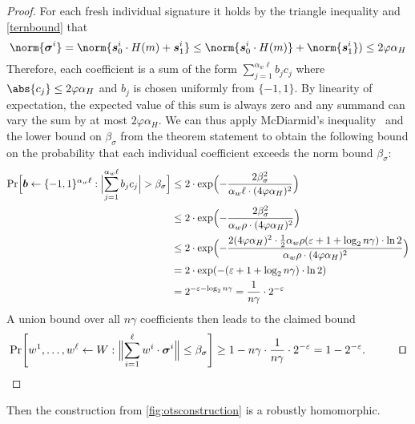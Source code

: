 \begin{proof}
  For each fresh individual signature it holds by the triangle inequality and \autoref{ternbound} that
  \[
    \norm{\vec{\sigma}^i} = \norm{\vec{s}_0^i\cdot H(m)+\vec{s}_1^i} \leq \norm{\vec{s}_0^i\cdot H(m)}+\norm{\vec{s}_1^i})
    \leq 2\varphi\alpha_H
  \]
  Therefore, each coefficient is a sum of the form
  \(
    \sum_{j=1}^{\alpha_w\ell}b_j c_j
  \)
  where $\abs{c_j}\leq 2\varphi\alpha_H$ and $b_j$ is chosen uniformly from $\{-1,1\}$.
  By linearity of expectation, the expected value of this sum is always zero and any summand can vary the sum by at most $2\varphi\alpha_H$. We can thus apply McDiarmid's inequality~\cite{McDiarmid89} and the lower bound on $\beta_\sigma$ from the theorem statement to obtain the following bound on the probability that each individual coefficient exceeds the norm bound $\beta_\sigma$:
  \begin{align*}
    \Pr\Bigl[\vec{b}\gets\{-1,1\}^{\alpha_w\ell} : \Bigl|\smashoperator{\sum_{j=1}^{\alpha_w\ell}}b_j c_j\Bigr| > \beta_\sigma\Bigr]
    \leq{}& 2\cdot\exp\Bigl(-\frac{2\beta_\sigma^2}{\alpha_w\ell\cdot (4\varphi\alpha_H)^2}\Bigr)\\
    \leq{}& 2\cdot\exp\Bigl(-\frac{2\beta_\sigma^2}{\alpha_w\rho\cdot (4\varphi\alpha_H)^2}\Bigr)\\
    \leq{}& 2\cdot\exp\Bigl(-\frac{2(4\varphi\alpha_H)^2\cdot\tfrac{1}{2}\alpha_w\rho(\varepsilon+1+\log_2n\gamma)\cdot\ln2}{\alpha_w\rho\cdot (4\varphi\alpha_H)^2}\Bigr)\\
    ={}& 2\cdot\exp(-(\varepsilon+1+\log_2n\gamma)\cdot\ln2)\\
    ={}& 2^{-\varepsilon-\log_2n\gamma} = \frac{1}{n\gamma}\cdot 2^{-\varepsilon}
  \end{align*}
  A union bound over all $n\gamma$ coefficients then leads to the claimed bound
  \[
    \Pr\mleft[
      w^1,\dots,w^\ell\gets W
      :
      \Bigl\Vert\sum_{i=1}^{\ell} w^i\cdot\vec{\sigma}^i\Bigr\Vert \leq \beta_\sigma\mright] \geq 1- n\gamma\cdot\frac{1}{n\gamma}\cdot 2^{-\varepsilon} = 1-2^{-\varepsilon}.\tag*{\qed}
  \]
\end{proof}

\begin{lemma}\label{lem:kots_homomorphic}
  Then the construction from \autoref{fig:otsconstruction} is a robustly homomorphic.
\end{lemma}

